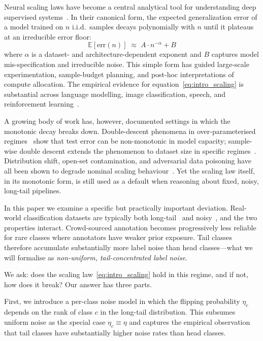 \documentclass[11pt]{article}
\begin{document}
Neural scaling laws have become a central analytical tool for understanding deep supervised systems~\cite{hestness2017, kaplan2020, hoffmann2022}. In their canonical form, the expected generalization error of a model trained on $n$ i.i.d.\ samples decays polynomially with $n$ until it plateaus at an irreducible error floor:
\begin{equation}
\mathbb{E}[\mathrm{err}(n)] \;\approx\; A \cdot n^{-\alpha} + B \label{eq:intro_scaling}
\end{equation}
where $\alpha$ is a dataset- and architecture-dependent exponent and $B$ captures model mis-specification and irreducible noise. This simple form has guided large-scale experimentation, sample-budget planning, and post-hoc interpretations of compute allocation. The empirical evidence for equation~\eqref{eq:intro_scaling} is substantial across language modelling, image classification, speech, and reinforcement learning~\cite{kaplan2020, henighan2020, hoffmann2022, sharma2022}.

A growing body of work has, however, documented settings in which the monotonic decay breaks down. Double-descent phenomena in over-parameterised regimes~\cite{belkin2019, nakkiran2020} show that test error can be non-monotonic in model capacity; sample-wise double descent extends the phenomenon to dataset size in specific regimes~\cite{nakkiran2020samplewise}. Distribution shift, open-set contamination, and adversarial data poisoning have all been shown to degrade nominal scaling behaviour~\cite{koh2021, fang2022, carlini2023}. Yet the scaling law itself, in its monotonic form, is still used as a default when reasoning about fixed, noisy, long-tail pipelines.

In this paper we examine a specific but practically important deviation. Real-world classification datasets are typically both long-tail~\cite{liu2019longtail, vanhorn2018inaturalist} and noisy~\cite{northcutt2021, song2022}, and the two properties interact. Crowd-sourced annotation becomes progressively less reliable for rare classes where annotators have weaker prior exposure. Tail classes therefore accumulate substantially more label noise than head classes---what we will formalise as \emph{non-uniform, tail-concentrated label noise}.

We ask: does the scaling law~\eqref{eq:intro_scaling} hold in this regime, and if not, how does it break? Our answer has three parts.

First, we introduce a per-class noise model in which the flipping probability $\eta_c$ depends on the rank of class $c$ in the long-tail distribution. This subsumes uniform noise as the special case $\eta_c \equiv \eta$ and captures the empirical observation that tail classes have substantially higher noise rates than head classes.
\end{document}
